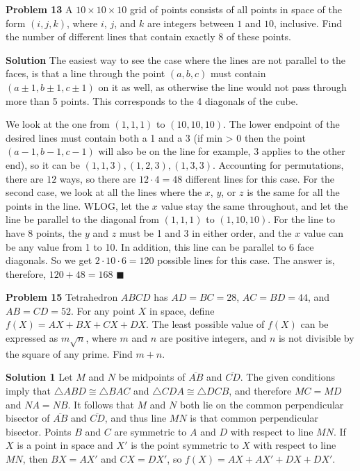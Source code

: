 \documentclass[a4paper,11pt]{article}
\begin{document}
\textbf{Problem 13}
A $10\times10\times10$ grid of points consists of all points in space of the form $(i,j,k)$, where $i$, $j$, and $k$ are integers between $1$ and $10$, inclusive. Find the number of different lines that contain exactly $8$ of these points.

\textbf{Solution}
The easiest way to see the case where the lines are not parallel to the faces, is that a line through the point $(a,b,c)$ must contain $(a \pm 1, b \pm 1, c \pm 1)$ on it as well, as otherwise the line would not pass through more than 5 points. This corresponds to the 4 diagonals of the cube.

We look at the one from $(1,1,1)$ to $(10,10,10)$. The lower endpoint of the desired lines must contain both a 1 and a 3 (if min > 0 then the point $(a-1,b-1,c-1)$ will also be on the line for example, 3 applies to the other end), so it can be $(1,1,3), (1,2,3), (1,3,3)$. Accounting for permutations, there are $12$ ways, so there are $12 \cdot 4 = 48$ different lines for this case. For the second case, we look at all the lines where the $x$, $y$, or $z$ is the same for all the points in the line. WLOG, let the $x$ value stay the same throughout, and let the line be parallel to the diagonal from $(1,1,1)$ to $(1,10,10)$. For the line to have 8 points, the $y$ and $z$ must be 1 and 3 in either order, and the $x$ value can be any value from 1 to 10. In addition, this line can be parallel to 6 face diagonals. So we get $2 \cdot 10 \cdot 6 = 120$ possible lines for this case. The answer is, therefore, $120 + 48 = \boxed{168}$
\hfill $\blacksquare$

\textbf{Problem 15}
Tetrahedron $ABCD$ has $AD=BC=28$, $AC=BD=44$, and $AB=CD=52$. For any point $X$ in space, define $f(X)=AX+BX+CX+DX$. The least possible value of $f(X)$ can be expressed as $m\sqrt{n}$, where $m$ and $n$ are positive integers, and $n$ is not divisible by the square of any prime. Find $m+n$.


\textbf{Solution 1}
Let $M$ and $N$ be midpoints of $\overline{AB}$ and $\overline{CD}$. The given conditions imply that $\triangle ABD\cong\triangle BAC$ and $\triangle CDA\cong\triangle DCB$, and therefore $MC=MD$ and $NA=NB$. It follows that $M$ and $N$ both lie on the common perpendicular bisector of $\overline{AB}$ and $\overline{CD}$, and thus line $MN$ is that common perpendicular bisector. Points $B$ and $C$ are symmetric to $A$ and $D$ with respect to line $MN$. If $X$ is a point in space and $X'$ is the point symmetric to $X$ with respect to line $MN$, then $BX=AX'$ and $CX=DX'$, so $f(X) = AX+AX'+DX+DX'$.
\end{document}

